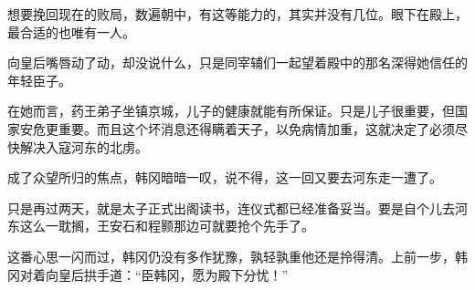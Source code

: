 想要挽回现在的败局，数遍朝中，有这等能力的，其实并没有几位。眼下在殿上，最合适的也唯有一人。

向皇后嘴唇动了动，却没说什么，只是同宰辅们一起望着殿中的那名深得她信任的年轻臣子。

在她而言，药王弟子坐镇京城，儿子的健康就能有所保证。只是儿子很重要，但国家安危更重要。而且这个坏消息还得瞒着天子，以免病情加重，这就决定了必须尽快解决入寇河东的北虏。

成了众望所归的焦点，韩冈暗暗一叹，说不得，这一回又要去河东走一遭了。

只是再过两天，就是太子正式出阁读书，连仪式都已经准备妥当。要是自个儿去河东这么一耽搁，王安石和程颢那边可就要抢个先手了。

这番心思一闪而过，韩冈仍没有多作犹豫，孰轻孰重他还是拎得清。上前一步，韩冈对着向皇后拱手道：“臣韩冈，愿为殿下分忧！”
